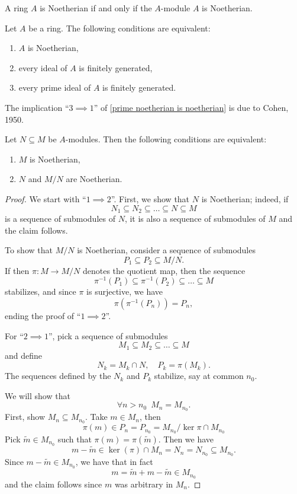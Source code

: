 \begin{df}
  A ring $A$ is Noetherian if and only if the $A$-module $A$ is Noetherian. 
\end{df}

\begin{prop}
  \label{prime noetherian is noetherian}
  Let $A$ be a ring. The following conditions are equivalent:
  \begin{enumerate}
  \item $A$ is Noetherian,
  \item every ideal of $A$ is finitely generated,
  \item every prime ideal of $A$ is finitely generated.
  \end{enumerate}
  \hfill\blacksquare
\end{prop}

The implication ``$3 \implies 1$'' of \cref{prime noetherian is noetherian} is due to Cohen, 1950.

\begin{prop}
  \label{noetherian-extensions}
  Let $N \subseteq M$ be $A$-modules. Then the following conditions are equivalent:
  \begin{enumerate}
  \item $M$ is Noetherian,
  \item $N$ and $M/{N}$ are Noetherian.
  \end{enumerate}
\end{prop}
\begin{proof}
  We start with ``$1 \implies 2$''. First, we show that $N$ is Noetherian; indeed, if
  \[ N_1 \subseteq N_2 \subseteq \ldots \subseteq N \subseteq M\]
  is a sequence of submodules of $N$, it is also a sequence of submodules of $M$ and the claim follows.

  To show that $M /{N}$ is Noetherian, consider a sequence of submodules
  \[ P_1 \subseteq P_2 \subseteq M /{N}.\]
  If then $\pi \colon M \to M /{N}$ denotes the quotient map, then the sequence
  \[ \pi^{-1}(P_1) \subseteq \pi^{-1}(P_2) \subseteq \ldots \subseteq M\]
  stabilizes, and since $\pi$ is surjective, we have
  \[ \pi(\pi^{-1}(P_n)) = P_n,\]
  ending the proof of ``$1 \implies 2$''.

  For ``$2 \implies 1$'', pick a sequence of submodules
  \[M_1 \subseteq M_2 \subseteq \ldots \subseteq M\]
  and define
  \[ N_k = M_k \cap N, \quad P_k = \pi(M_k).\]
  The sequences defined by the $N_k$ and $P_k$ stabilize, say at common $n_0$.

  We will show that
  \[ \forall n > n_0 \enspace M_n = M_{n_0}.\]
  First, show $M_n \subseteq M_{n_0}$. Take $m \in M_n$, then
  \[ \pi(m) \in P_n = P_{n_0} = M_{n_0} / {\ker \pi \cap M_{n_0}}\]
  Pick $\tilde m \in M_{n_0}$ such that $\pi(m) = \pi(\tilde m)$.
  Then we have
  \[ m - \tilde{m} \in \ker(\pi) \cap M_n = N_n = N_{n_0} \subseteq M_{n_0}.\]
  Since $m-\tilde{m} \in M_{n_0}$, we have that
  in fact
  \[ m = \tilde{m} + m - \tilde{m} \in M_{n_0}\]
  and the claim follows since $m$ was arbitrary in $M_n$.
\end{proof}


